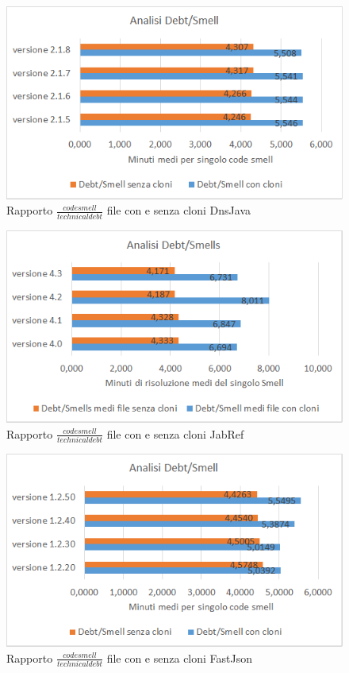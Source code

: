 \begin{figure}[htbp]
	\centering
	\includegraphics[scale=0.75, trim = 0cm 0cm 0cm 0cm, clip=true]{Grafici_dnsJava/Debt-Smell.png}
	\caption{Rapporto $\frac{code smell}{technical debt}$ file con e senza cloni DnsJava}
	\label{fig:rapDnsJava}	
\end{figure}
\begin{figure}[htbp]
	\centering
	\includegraphics[scale=0.75, trim = 0cm 0cm 0cm 0cm, clip=true]{Grafici_jabRef/Debt-Smells.png}
	\caption{Rapporto $\frac{code smell}{technical debt}$ file con e senza cloni JabRef}
	\label{fig:rapJabRef}
\end{figure}
\begin{figure}[htbp]
	\centering
	\includegraphics[scale=0.75, trim = 0cm 0cm 0cm 0cm, clip=true]{Grafici_fastJson/Debt-Smell.png}
	\caption{Rapporto $\frac{code smell}{technical debt}$ file con e senza cloni FastJson}
	\label{fig:rapFastjson}
\end{figure}

